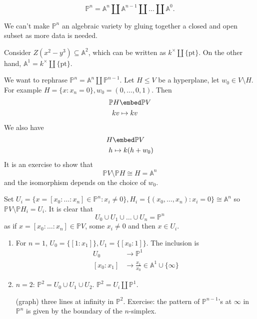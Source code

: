 \documentclass[a4paper]{article}
\renewcommand{\A}{\mathbb{A}}
\renewcommand*{\P}{\mathbb{P}}
\begin{document}
\begin{corollary}
  \[
    \P^n = \A^n \amalg \A^{n - 1} \amalg \dots \amalg \A^0.
  \]
\end{corollary}

We can't make \(\P^n\) an algebraic variety by gluing together a closed and open subset as more data is needed.

\begin{ex}
  Consider \(Z(x^2 - y^3) \subseteq \A^2\), which can be written as \(k^\times \amalg \{\text{pt}\}\). On the other hand, \(\A^1 = k^\times \amalg \{\text{pt}\}\).
\end{ex}

We want to rephrase \(\P^n = \A^n \amalg \P^{n - 1}\). Let \(H \leq V\) be a hyperplane, let \(w_0 \in V \setminus H\). For example \(H = \{x: x_n = 0\}, w_0 = (0, \dots, 0, 1)\). Then
\begin{align*}
  \P H &\embed \P V \\
  kv &\mapsto kv
\end{align*}
We also have
\begin{align*}
  H &\embed \P V \\
  h &\mapsto k(h + w_0)
\end{align*}
It is an exercise to show that
\[
  \P V \setminus \P H \cong H = \A^n
\]
and the isomorphism depends on the choice of \(w_0\).

Set \(U_i = \{x = [x_0: \dots : x_n] \in \P^n: x_i \neq 0\}, H_i = \{(x_0, \dots, x_n): x_i = 0\} \cong \A^n\) so \(\P V \setminus \P H_i = U_i\). It is clear that
\[
  U_0 \cup U_1 \cup \dots \cup U_n = \P^n
\]
as if \(x = [x_0 : \dots : x_n] \in \P V\), some \(x_i \neq 0\) and then \(x \in U_i\).

\begin{eg}\leavevmode
  \begin{enumerate}
  \item For \(n = 1\), \(U_0 = \{[1: x_1]\}, U_1 = \{[x_0 : 1]\}\). The inclusion is
    \begin{align*}
      U_0 &\to \P^1 \\
      [x_0 : x_1] &\to \frac{x_1}{x_0} \in \A^1 \cup \{\infty\}
    \end{align*}
  \item \(n = 2\): \(\P^2 = U_0 \cup U_1 \cup U_2\). \(\P^2 = U_i \amalg \P^1\).

    (graph) three lines at infinity in \(\P^2\). Exercise: the pattern of \(\P^{n - 1}\)'s at \(\infty\) in \(\P^n\) is given by the boundary of the \(n\)-simplex.
  \end{enumerate}
\end{eg}
\end{document}
